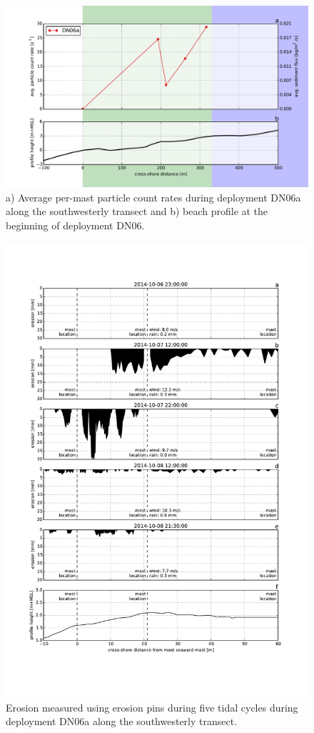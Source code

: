 \begin{figure}
 \centering
  \includegraphics[width=\columnwidth]{../Figures/particlecounts_DN06}
  \caption{a) Average per-mast particle count rates during deployment
    DN06a along the southwesterly transect and b) beach profile at the
    beginning of deployment DN06.}
  \label{fig:pc_transect_DN06}
\end{figure}

\begin{figure}
 \centering
  \includegraphics[width=\columnwidth]{../Figures/nails}
  \caption{Erosion measured using erosion pins during five tidal
    cycles during deployment DN06a along the southwesterly transect.}
  \label{fig:nails}
\end{figure}


